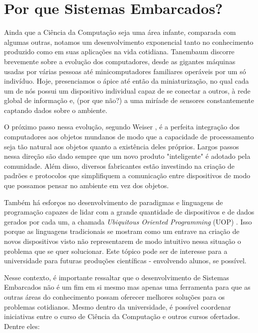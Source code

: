 \documentclass[12pt]{article}
\begin{document}

\pagebreak
\section{Por que Sistemas Embarcados?}
\begin{multicols}{2}
    Ainda que a Ciência da Computação seja uma área infante, comparada com algumas outras, notamos um desenvolvimento exponencial tanto no conhecimento produzido como em suas aplicações na vida cotidiana. Tanembaum \cite{tanenbaum2016structured} discorre brevemente sobre a evolução dos computadores, desde as gigantes máquinas usadas por várias pessoas até minicomputadores familiares operáveis por um só indivíduo. Hoje, presenciamos o ápice até então da miniaturização, no qual cada um de nós possui um dispositivo individual capaz de se conectar a outros, à rede global de informação e, (por que não?) a uma miríade de sensores constantemente captando dados sobre o ambiente.

    O próximo passo nessa evolução, segundo Weiser \cite{weiser1991computer}, é a perfeita integração dos computadores aos objetos mundanos de modo que a capacidade de processamento seja tão natural aos objetos quanto a existência deles próprios. Largos passos nessa direção são dado sempre que um novo produto "inteligente" é adotado pela comunidade. Além disso, diversos fabricantes estão investindo na criação de padrões \cite{build-matter} e protocolos \cite{whatis-lorawan} que simplifiquem a comunicação entre dispositivos de modo que possamos pensar no ambiente em vez dos objetos.

    Também há esforços no desenvolvimento de paradigmas e linguagens de programação capazes de lidar com a grande quantidade de dispositivos e de dados gerados por cada um, a chamada \emph{Ubiquitous Oriented Programming} (UOP) \cite{Garzão_Gonçales_Barbosa_2014}. Isso porque as linguagens tradicionais se mostram como um entrave na criação de novos dispositivos visto não representarem de modo intuitivo nessa situação o problema que se quer solucionar. Este tópico pode ser de interesse para a universidade para futuras produções científicas - envolvendo alunos, se possível.

    Nesse contexto, é importante ressaltar que o desenvolvimento de Sistemas Embarcados não é um fim em si mesmo mas apenas uma ferramenta para que as outras áreas do conhecimento possam oferecer melhores soluções para os problemas cotidianos. Mesmo dentro da universidade, é possível coordenar iniciativas entre o curso de Ciência da Computação e outros cursos ofertados. Dentre eles:


\end{multicols}
\end{document}
